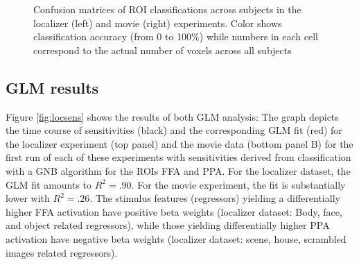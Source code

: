 \documentclass[a4paper, 12pt]{scrreprt}
\begin{document}
\begin{figure}[H]

	\caption[Classification results in two proof-of-concept analyses]{\small{Confusion matrices of ROI classifications across subjects in the localizer (left) and movie (right) experiments. Color shows classification accuracy (from 0 to 100$\%$) while numbers in each cell correspond to the actual number of voxels across all subjects }}
	\label{fig:CV}
\end{figure}




\subsection{GLM results}\label{sec:c1_glm_res}

Figure \ref{fig:locsens} shows the results of both GLM analysis: The graph depicts the time course of sensitivities (black) and the corresponding GLM fit (red) for the localizer experiment (top panel) and the movie data (bottom panel B) for the first run of each of these experiments with sensitivities derived from classification with a GNB algorithm for the ROIs FFA and PPA. For the localizer dataset, the GLM fit amounts to $R^2 = .90$. For the movie experiment, the fit is substantially lower with $R^2 = .26$. The stimulus features (regressors) yielding a differentially higher FFA activation have positive beta weights (localizer dataset: Body, face, and object related regressors), while those yielding differentially higher PPA activation have negative beta weights (localizer dataset: scene, house, scrambled images related regressors).
\end{document}
